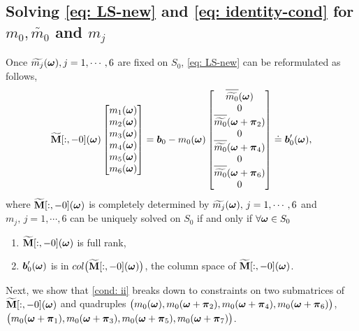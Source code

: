 \subsection{Solving \eqref{eq: LS-new} and \eqref{eq: identity-cond} for $m_0,\widetilde{m_0}$ and $m_j$}\label{subsec: compute-m0}
Once $\widetilde{m_{j}}(\boldsymbol{\omega}), j= 1,\cdots, 6$ are fixed on $S_0$, \eqref{eq: LS-new} can be reformulated as follows,
\begin{align}\label{eq: mj-eq}
\M[:,-0](\V{\omega}) 
\begin{bmatrix}
m_1(\V{\omega})\\
m_2(\V{\omega})\\
m_3(\V{\omega})\\
m_4(\V{\omega})\\
m_5(\V{\omega})\\
m_6(\V{\omega})
\end{bmatrix}
= \V{b}_0 - m_0(\V{\omega})
\begin{bmatrix}
 \sbarm{0}\\
 0\\
\sbarmp{0}{2}\\
0\\
\sbarmp{0}{4}\\
0\\
\sbarmp{0}{6}\\
0
\end{bmatrix} \doteq \V{b}_0'(\V{\omega}),
\end{align}
where $\widetilde{\mathbf{M}}[:,-0](\boldsymbol{\omega})$ is completely determined by $\widetilde{m_{j}}(\boldsymbol{\omega}),\,j = 1,\cdots,6$ 
and $m_j,\,j=1,\cdots,6$ can be uniquely solved on $S_0$ if and only if $\forall\boldsymbol{\omega}\in S_0$
\hspace{-1em}
\begin{enumerate}[leftmargin=.5in]
\item[\mylabel{cond: i}{(\ref{subsec: compute-m0}.i)}] $\widetilde{\mathbf{M}}[:,-0](\boldsymbol{\omega})$ is full rank,%
\item[\mylabel{cond: ii}{(\ref{subsec: compute-m0}.ii)}] $\boldsymbol{b}_0'(\boldsymbol{\omega})$ is in $col\big(\widetilde{\mathbf{M}}[:,-0](\boldsymbol{\omega})\big)$, the column space of $\widetilde{\mathbf{M}}[:,-0](\boldsymbol{\omega})$.%
\end{enumerate}
Next, we show that \ref{cond: ii} breaks down to constraints on two submatrices of $\widetilde{\mathbf{M}}[:,-0](\boldsymbol{\omega})$ and quadruples $\big( m_0(\boldsymbol{\omega}),m_0(\boldsymbol{\omega}+\boldsymbol{\pi}_2), m_0(\boldsymbol{\omega} +\boldsymbol{\pi}_4), m_0(\boldsymbol{\omega}+\boldsymbol{\pi}_6) \big)$, $\big( m_0(\boldsymbol{\omega}+\boldsymbol{\pi}_1),m_0(\boldsymbol{\omega}+\boldsymbol{\pi}_3), m_0(\boldsymbol{\omega} +\boldsymbol{\pi}_5), m_0(\boldsymbol{\omega}+\boldsymbol{\pi}_7) \big)$.
